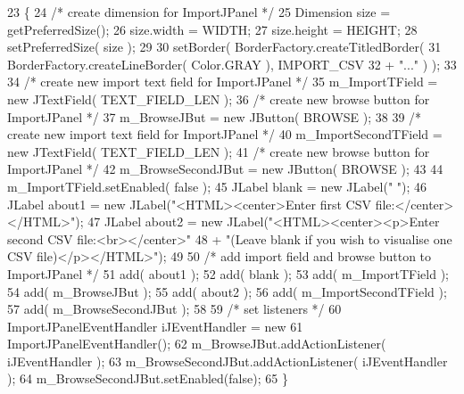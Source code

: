 \begin{DoxyCode}
23                           \{
24         \textcolor{comment}{/* create dimension for ImportJPanel */}
25         Dimension size = getPreferredSize();
26         size.width = WIDTH;
27         size.height = HEIGHT;
28         setPreferredSize( size );
29         
30         setBorder( BorderFactory.createTitledBorder(
31                 BorderFactory.createLineBorder( Color.GRAY ), IMPORT\_CSV
32                 + \textcolor{stringliteral}{"..."} ) );
33         
34         \textcolor{comment}{/* create new import text field for ImportJPanel */}
35         m\_ImportTField = \textcolor{keyword}{new} JTextField( TEXT\_FIELD\_LEN );
36         \textcolor{comment}{/* create new browse button for ImportJPanel */}
37         m\_BrowseJBut = \textcolor{keyword}{new} JButton( BROWSE );
38         
39         \textcolor{comment}{/* create new import text field for ImportJPanel */}
40         m\_ImportSecondTField = \textcolor{keyword}{new} JTextField( TEXT\_FIELD\_LEN );
41         \textcolor{comment}{/* create new browse button for ImportJPanel */}
42         m\_BrowseSecondJBut = \textcolor{keyword}{new} JButton( BROWSE );
43         
44         m\_ImportTField.setEnabled( \textcolor{keyword}{false} );
45         JLabel blank  = \textcolor{keyword}{new} JLabel(\textcolor{stringliteral}{"                                                   "});
46         JLabel about1 = \textcolor{keyword}{new} JLabel(\textcolor{stringliteral}{"<HTML><center>Enter first CSV file:</center></HTML>"});
47         JLabel about2 = \textcolor{keyword}{new} JLabel(\textcolor{stringliteral}{"<HTML><center><p>Enter second CSV file:<br></center>"}
48                         + \textcolor{stringliteral}{"(Leave blank if you wish to visualise one CSV file)</p></HTML>"});
49         
50         \textcolor{comment}{/* add import field and browse button to ImportJPanel */}
51         add( about1 );
52         add( blank );
53         add( m\_ImportTField );
54         add( m\_BrowseJBut );
55         add( about2 );
56         add( m\_ImportSecondTField );
57         add( m\_BrowseSecondJBut );
58         
59         \textcolor{comment}{/* set listeners */}
60         ImportJPanelEventHandler iJEventHandler = \textcolor{keyword}{new} 
61                 ImportJPanelEventHandler();
62         m\_BrowseJBut.addActionListener( iJEventHandler );
63         m\_BrowseSecondJBut.addActionListener( iJEventHandler );
64         m\_BrowseSecondJBut.setEnabled(\textcolor{keyword}{false});  
65     \}    
\end{DoxyCode}


